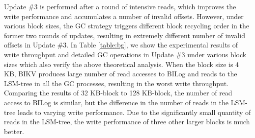 \documentclass[sigconf]{acmart}
\begin{document}
Update \#3 is performed after a round of intensive reads, which improves the write performance and accumulates a number of invalid offsets. However, under various block sizes, the GC strategy triggers different block recycling order in the former two rounds of updates, resulting in extremely different number of invalid offsets in Update \#3. In Table \ref{table:bg}, we show the experimental results of write throughput and detailed GC operations in Update \#3 under various block sizes which also verify the above theoretical analysis. When the block size is 4 KB, BIKV produces large number of read accesses to BILog and reads to the LSM-tree in all the GC processes, resulting in the worst write throughput. Comparing the results of 32 KB-block to 128 KB-block, the number of read access to BILog is similar, but the difference in the number of reads in the LSM-tree leads to varying write performance. Due to the significantly small quantity of reads in the LSM-tree, the write performance of three other larger blocks is much better.
\begin{table}[t]
	\setlength{\abovecaptionskip}{0.cm}	
	\setlength{\belowcaptionskip}{-0.cm}
	\centering		
	\makeatletter{}\makeatother\caption{The detailed GC operations in Update \#3 under various block sizes. }
	\label{table:bg}
	\renewcommand\tabcolsep{4pt}
	\renewcommand\arraystretch{1.1}
\end{table} 
\end{document}
